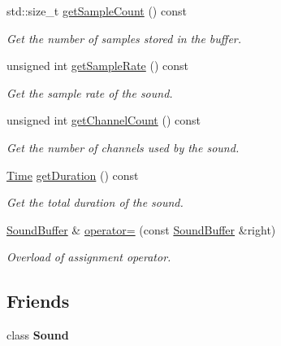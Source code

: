 \begin{DoxyCompactItemize}
std\+::size\+\_\+t \hyperlink{classsf_1_1_sound_buffer_a2df1f1ae89213adee1494b95bb583f9d}{get\+Sample\+Count} () const 
\begin{DoxyCompactList}\small\item\em Get the number of samples stored in the buffer. \end{DoxyCompactList}\item 
unsigned int \hyperlink{classsf_1_1_sound_buffer_a8cdfaea2ad1d05f81fa67442566c166e}{get\+Sample\+Rate} () const 
\begin{DoxyCompactList}\small\item\em Get the sample rate of the sound. \end{DoxyCompactList}\item 
unsigned int \hyperlink{classsf_1_1_sound_buffer_a0a2890747db3811fb8d969d3e3abd0d1}{get\+Channel\+Count} () const 
\begin{DoxyCompactList}\small\item\em Get the number of channels used by the sound. \end{DoxyCompactList}\item 
\hyperlink{classsf_1_1_time}{Time} \hyperlink{classsf_1_1_sound_buffer_aee681c7a0f3dff4c4d0c9f8bbdb51bb0}{get\+Duration} () const 
\begin{DoxyCompactList}\small\item\em Get the total duration of the sound. \end{DoxyCompactList}\item 
\hyperlink{classsf_1_1_sound_buffer}{Sound\+Buffer} \& \hyperlink{classsf_1_1_sound_buffer_adcc786b60bbd95be1551368fafd274a7}{operator=} (const \hyperlink{classsf_1_1_sound_buffer}{Sound\+Buffer} \&right)
\begin{DoxyCompactList}\small\item\em Overload of assignment operator. \end{DoxyCompactList}\end{DoxyCompactItemize}
\subsection*{Friends}
\begin{DoxyCompactItemize}
\item 
\hypertarget{classsf_1_1_sound_buffer_a50914f77c7cf4fb97616c898c5291f4b}{class {\bfseries Sound}}\label{classsf_1_1_sound_buffer_a50914f77c7cf4fb97616c898c5291f4b}

\end{DoxyCompactItemize}


